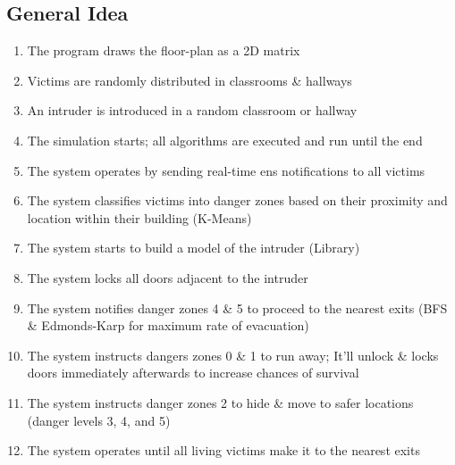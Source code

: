 \documentclass[12pt]{article}
\begin{document}
\subsection*{General Idea}
\begin{enumerate}
\item The program draws the floor-plan as a 2D matrix
\item Victims are randomly distributed in classrooms \& hallways
\item An intruder is introduced in a random classroom or hallway
\item The simulation starts; all algorithms are executed and run until the end
\item The system operates by sending real-time ens notifications to all victims
\item The system classifies victims into danger zones based on their proximity and location within their building (K-Means)
\item The system starts to build a model of the intruder (Library)
\item The system locks all doors adjacent to the intruder
\item The system notifies danger zones 4 \& 5 to proceed to the nearest exits (BFS \& Edmonds-Karp for maximum rate of evacuation)
\item The system instructs dangers zones 0 \& 1 to run away; It'll unlock \& locks doors immediately afterwards to increase chances of survival
\item The system instructs danger zones 2 to hide \& move to safer locations (danger levels 3, 4, and 5)
\item The system operates until all living victims make it to the nearest exits
\end{enumerate}
\end{document}
